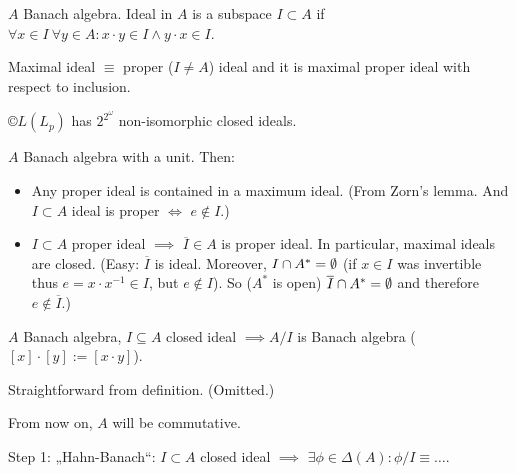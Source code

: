 \documentclass[12pt]{article}					%
\begin{document}
\begin{definice}
	$A$ Banach algebra. Ideal in $A$ is a subspace $I \subset A$ if $\forall x \in I\ \forall y \in A: x·y \in I \land y·x \in I$.

	Maximal ideal $≡$ proper ($I ≠ A$) ideal and it is maximal proper ideal with respect to inclusion.

	\begin{priklady}
		$©L(L_p)$ has $2^{2^\omega}$ non-isomorphic closed ideals.
	\end{priklady}
\end{definice}

\begin{tvrzeni}
	$A$ Banach algebra with a unit. Then:

	\begin{itemize}
		\item Any proper ideal is contained in a maximum ideal. (From Zorn's lemma. And $I \subset A$ ideal is proper $\Leftrightarrow$ $e \notin I$.)
		\item $I \subset A$ proper ideal $\implies$ $\overline{I} \in A$ is proper ideal. In particular, maximal ideals are closed. (Easy: $\overline{I}$ is ideal. Moreover, $I \cap A^* = \emptyset$ (if $x \in I$ was invertible thus $e = x·x^{-1} \in I$, but $e \notin I$). So ($A^*$ is open) $\overline{I} \cap A^* = \emptyset$ and therefore $e \notin \overline{I}$.)
	\end{itemize}
\end{tvrzeni}

\begin{tvrzeni}
	$A$ Banach algebra, $I \subseteq A$ closed ideal $\implies A / I$ is Banach algebra ($[x]·[y] := [x·y]$).

	\begin{dukazin}
		Straightforward from definition. (Omitted.)
	\end{dukazin}
\end{tvrzeni}

\begin{poznamka}
	From now on, $A$ will be commutative.

	Step 1: „Hahn-Banach“: $I \subset A$ closed ideal $\implies$ $\exists \phi \in \Delta(A): \phi / I ≡ …$.
\end{poznamka}
\end{document}
